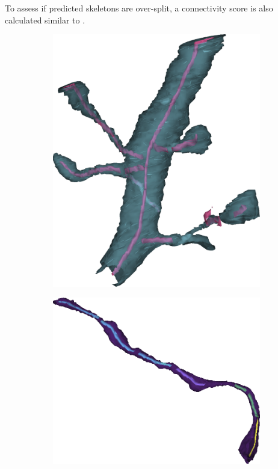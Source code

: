 To assess if predicted skeletons are over-split, a connectivity score is also calculated similar to \cite{Liang2019}.


\begin{figure}[htpb]
	\centering
	\begin{subfigure}[b]{0.3\textwidth}
		\centering
		\includegraphics[width=\textwidth]{data/images/splitNMatch2/train_good.png}
		\caption{\label{fig:merged_train}}
	\end{subfigure}
	\hspace{3mm}
	\begin{subfigure}[b]{0.4\textwidth}
		\centering
		\includegraphics[width=\textwidth]{data/images/splitNMatch2/val_good_bad.png}

\end{subfigure}
\end{figure}
